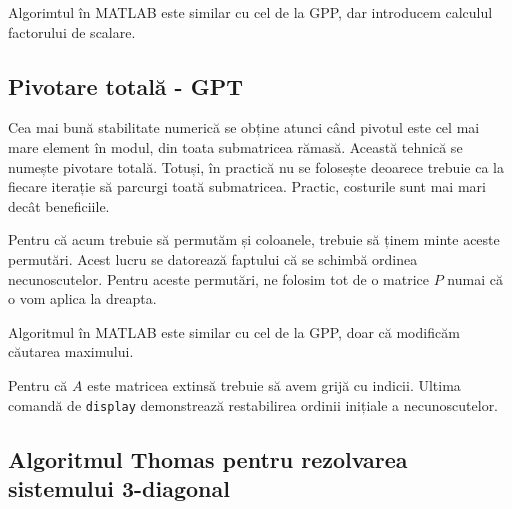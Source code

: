 \documentclass{exam}
\newcommand{\octavescript}[2]{
	
}
\begin{document}
\par Algorimtul în MATLAB este similar cu cel de la GPP, dar introducem
calculul factorului de scalare.

\octavescript{./src/GPPS.m}{}

\subsection{Pivotare totală - GPT}

\par Cea mai bună stabilitate numerică se obține atunci când pivotul este cel
mai mare element în modul, din toata submatricea rămasă. Această tehnică se
numește pivotare totală. Totuși, în practică nu se folosește deoarece trebuie
ca la fiecare iterație să parcurgi toată submatricea. Practic, costurile
sunt mai mari decât beneficiile.

\par Pentru că acum trebuie să permutăm și coloanele, trebuie să ținem minte
aceste permutări. Acest lucru se datorează faptului că se schimbă ordinea
necunoscutelor. Pentru aceste permutări, ne folosim tot de o matrice $P$ numai
că o vom aplica la dreapta.

\par Algoritmul în MATLAB este similar cu cel de la GPP, doar că modificăm
căutarea maximului.

\octavescript{./src/GPT.m}{}

\par Pentru că $A$ este matricea extinsă trebuie să avem grijă cu indicii.
Ultima comandă de \verb|display| demonstrează restabilirea ordinii inițiale a
necunoscutelor.

\subsection{Algoritmul Thomas pentru rezolvarea sistemului 3-diagonal}
\end{document}

